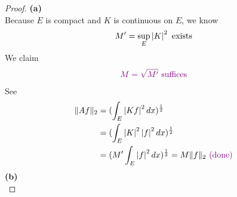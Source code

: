\documentclass{report}
\begin{document}
\begin{proof}
\textbf{(a)}\\

Because $E$ is compact and $K$ is continuous on $E$, we know
 \begin{align*}
M'=\sup_E \left|K\right|^2\text{ exists }
\end{align*}
We claim 
\begin{align*}
\textcolor{violet}{M=\sqrt{M'} \text{ suffices }}
\end{align*}
See 
\begin{align*}
\| Af \|_2&=(\int_E \left|Kf\right|^2dx)^{\frac{1}{2}}\\
&= (\int_E \left|K\right|^2 \left|f\right|^2dx)^{\frac{1}{2}}\\
&=(M'\int_E \left|f\right|^2dx)^{\frac{1}{2}}=M\| f \|_2 \textcolor{violet}{\text{ (done) }}
\end{align*}
\textbf{(b)}\\


\end{proof}
\end{document}
